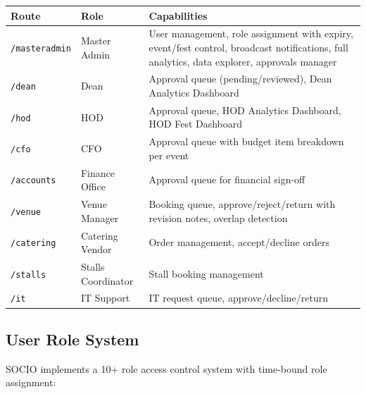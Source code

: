 \documentclass[12pt,a4paper]{article}
\begin{document}
\begin{tabularx}{\textwidth}{L{3cm} L{2.5cm} X}
\toprule
{}
\textbf{Route} & \textbf{Role} & \textbf{Capabilities} \\
\midrule
\texttt{/masteradmin} & Master Admin & User management, role assignment with expiry, event/fest control, broadcast notifications, full analytics, data explorer, approvals manager \\
\addlinespace
\texttt{/dean} & Dean & Approval queue (pending/reviewed), Dean Analytics Dashboard \\
\addlinespace
\texttt{/hod} & HOD & Approval queue, HOD Analytics Dashboard, HOD Fest Dashboard \\
\addlinespace
\texttt{/cfo} & CFO & Approval queue with budget item breakdown per event \\
\addlinespace
\texttt{/accounts} & Finance Office & Approval queue for financial sign-off \\
\addlinespace
\texttt{/venue} & Venue Manager & Booking queue, approve/reject/return with revision notes, overlap detection \\
\addlinespace
\texttt{/catering} & Catering Vendor & Order management, accept/decline orders \\
\addlinespace
\texttt{/stalls} & Stalls Coordinator & Stall booking management \\
\addlinespace
\texttt{/it} & IT Support & IT request queue, approve/decline/return \\
\bottomrule
\end{tabularx}

\subsection{User Role System}

SOCIO implements a 10+ role access control system with time-bound role assignment:
\end{document}
